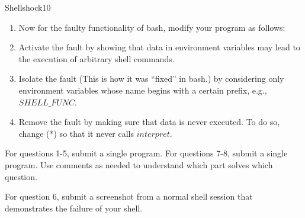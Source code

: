 \documentclass[a4paper]{article}
\begin{document}
\begin{problem}{Shellshock}{10}
\begin{enumerate}
\item Now for the faulty functionality of bash, modify your program as follows:

\item Activate the fault by showing that data in environment variables may lead to the execution of arbitrary shell commands.

\item Isolate the fault (This is how it was ``fixed'' in bash.) by considering only environment variables whose name begins with a certain prefix, e.g., $SHELL\_FUNC$.

\item Remove the fault by making sure that data is never executed.
To do so, change (*) so that it never calls $interpret$.
\end{enumerate}

For questions 1-5, submit a single program.
For questions 7-8, submit a single program.
Use comments as needed to understand which part solves which question.

For question 6, submit a screenshot from a normal shell session that demonstrates the failure of your shell.
\end{problem}
\end{document}

